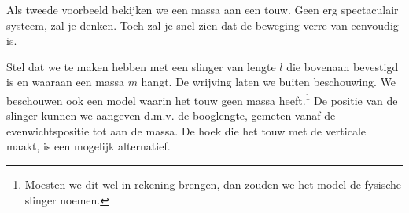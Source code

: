 \documentclass{ximera}
\begin{document}
	\author{Bart Lambregs}
    \xmsource






	Als tweede voorbeeld bekijken we een massa aan een touw. Geen erg spectaculair systeem, zal je denken. Toch zal je snel zien dat de beweging verre van eenvoudig is.
	
	Stel dat we te maken hebben met een slinger van lengte $l$ die bovenaan bevestigd is en waaraan een massa $m$ hangt. De wrijving laten we buiten beschouwing. We beschouwen ook een model waarin het touw geen massa heeft.\footnote{Moesten we dit wel in rekening brengen, dan zouden we het model de fysische slinger noemen.} De positie van de slinger kunnen we aangeven d.m.v. de booglengte, gemeten vanaf de evenwichtspositie tot aan de massa. De hoek die het touw met de verticale maakt, is een mogelijk alternatief. 
	
\end{document}
